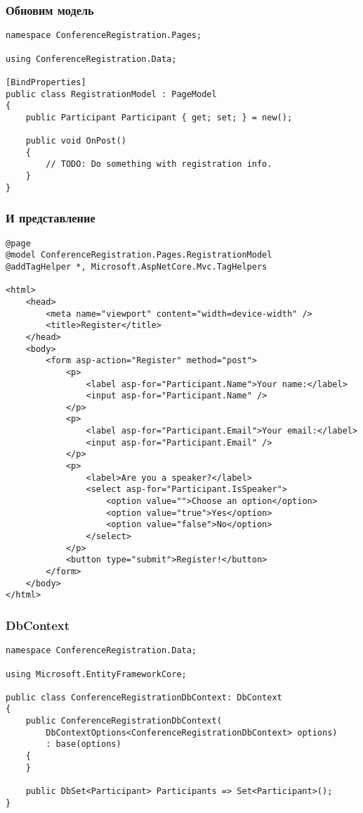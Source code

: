 \documentclass{../../slides-style}
\begin{document}
    \begin{frame}[fragile]
        \frametitle{Обновим модель}
        \begin{footnotesize}
            \begin{verbatim}
namespace ConferenceRegistration.Pages;

using ConferenceRegistration.Data;

[BindProperties]
public class RegistrationModel : PageModel
{
    public Participant Participant { get; set; } = new();

    public void OnPost()
    {
        // TODO: Do something with registration info.
    }
}
            \end{verbatim}
        \end{footnotesize}
    \end{frame}

    \begin{frame}[fragile]
        \frametitle{И представление}
        \begin{ssmall}
            \begin{verbatim}
@page
@model ConferenceRegistration.Pages.RegistrationModel
@addTagHelper *, Microsoft.AspNetCore.Mvc.TagHelpers

<html>
    <head>
        <meta name="viewport" content="width=device-width" />
        <title>Register</title>
    </head>
    <body>
        <form asp-action="Register" method="post">
            <p>
                <label asp-for="Participant.Name">Your name:</label>
                <input asp-for="Participant.Name" />
            </p>
            <p>
                <label asp-for="Participant.Email">Your email:</label>
                <input asp-for="Participant.Email" />
            </p>
            <p>
                <label>Are you a speaker?</label>
                <select asp-for="Participant.IsSpeaker">
                    <option value="">Choose an option</option>
                    <option value="true">Yes</option>
                    <option value="false">No</option>
                </select>
            </p>
            <button type="submit">Register!</button>
        </form>
    </body>
</html>
            \end{verbatim}
        \end{ssmall}
    \end{frame}

    \begin{frame}[fragile]
        \frametitle{DbContext}
        \begin{footnotesize}
            \begin{verbatim}
namespace ConferenceRegistration.Data;

using Microsoft.EntityFrameworkCore;

public class ConferenceRegistrationDbContext: DbContext
{
    public ConferenceRegistrationDbContext(
        DbContextOptions<ConferenceRegistrationDbContext> options)
        : base(options)
    {
    }

    public DbSet<Participant> Participants => Set<Participant>();
}
            \end{verbatim}
        \end{footnotesize}
    \end{frame}
\end{document}
